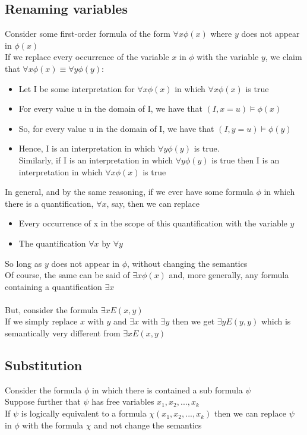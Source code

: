 \documentclass{article}[18pt]
\begin{document}
\subsection{Renaming variables}
Consider some first-order formula of the form $\forall x \phi(x)$ where $y$ does not appear in $\phi(x)$\\
If we replace every occurrence of the variable $x$ in $\phi$ with the variable $y$, we claim that $\forall x \phi (x) \equiv \forall y \phi (y)$:
\begin{itemize}
	\item Let I be some interpretation for $\forall x \phi (x)$ in which $\forall x \phi (x)$ is true
	\item For every value u in the domain of I, we have that $(I,x=u)\models \phi (x)$
	\item So, for every value u in the domain of I, we have that $(I,y=u)\models \phi (y)$
	\item Hence, I is an interpretation in which $\forall y \phi (y)$ is true.\\
	Similarly, if I is an interpretation in which $\forall y \phi (y)$ is true then I is an interpretation in which $\forall x \phi (x)$ is true
\end{itemize}
In general, and by the same reasoning, if we ever have some formula $\phi$ in which there is a quantification, $\forall x$, say, then we can replace
\begin{itemize}
	\item Every occurrence of x in the scope of this quantification with the variable $y$
	\item The quantification $\forall x$ by $\forall y$
\end{itemize}
So long as $y$ does not appear in $\phi$, without changing the semantics\\
Of course, the same can be said of $\exists x \phi (x)$ and, more generally, any formula containing a quantification $\exists x$\\
\\
But, consider the formula $\exists x E(x,y)$\\
If we simply replace $x$ with $y$ and $\exists x$ with $\exists y$ then we get $\exists y E(y,y)$ which is semantically very different from $\exists x E(x,y)$
\subsection{Substitution}
Consider the formula $\phi$ in which there is contained a sub formula $\psi$\\
Suppose further that $\psi$ has free variables $x_1,x_2,...,x_k$\\
If $\psi$ is logically equivalent to a formula $\chi (x_1,x_2,...,x_k)$ then we can replace $\psi$ in $\phi$ with the formula $\chi$ and not change the semantics
\end{document}

